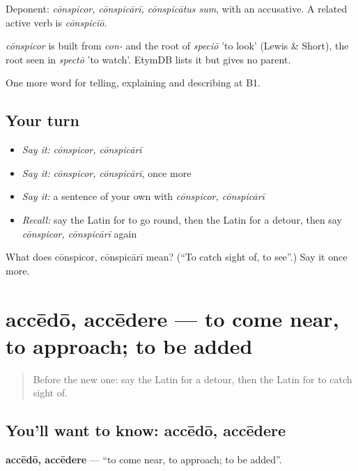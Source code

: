 Deponent: \emph{cōnspicor, cōnspicārī, cōnspicātus sum}, with an accusative. A related active verb is \emph{cōnspiciō}.

\begin{cousinweb}
\emph{cōnspicor} is built from \emph{con-} and the root of \emph{speciō} 'to look' (Lewis \& Short), the root seen in \emph{spectō} 'to watch'. EtymDB lists it but gives no parent.
\end{cousinweb}

\begin{grammarlens}[title={What you've built}]
One more word for telling, explaining and describing at B1.
\end{grammarlens}

\subsection*{Your turn}
\begin{itemize}
\raggedright
  \item \emph{Say it:} \emph{cōnspicor, cōnspicārī}
  \item \emph{Say it:} \emph{cōnspicor, cōnspicārī}, once more
  \item \emph{Say it:} a sentence of your own with \emph{cōnspicor, cōnspicārī}
  \item \emph{Recall:} say the Latin for to go round, then the Latin for a detour, then say \emph{cōnspicor, cōnspicārī} again
\end{itemize}

\begin{tcolorbox}[breakable,colback=teal!4,colframe=teal!35!black,title={Before you move on}]
What does cōnspicor, cōnspicārī mean? (\textquotedblleft{}To catch sight of, to see\textquotedblright{}.) Say it once more.
\end{tcolorbox}
\section[accēdō, accēdere]{accēdō, accēdere — to come near, to approach; to be added}

\label{lesson:LA-C455-accedo}



\begin{quote}
Before the new one: say the Latin for a detour, then the Latin for to catch sight of.
\end{quote}

\subsection*{You'll want to know: accēdō, accēdere}
\textbf{accēdō, accēdere} — \textquotedblleft{}to come near, to approach; to be added\textquotedblright{}.

